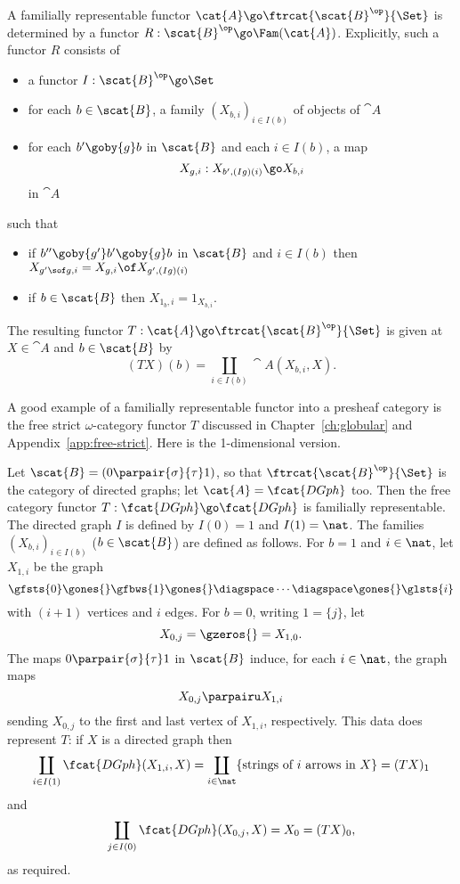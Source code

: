 A familially representable functor $\cat{A} \go
\ftrcat{\scat{B}^\op}{\Set}$ is determined by a functor $R: \scat{B}^\op
\go \Fam(\cat{A})$.  Explicitly, such a functor $R$ consists of
%
\begin{itemize}
\item a functor $I: \scat{B}^\op \go \Set$ 
\item for each $b \in \scat{B}$, a family $(X_{b,i})_{i\in I(b)}$ of objects
of $\cat{A}$
\item for each $b' \goby{g} b$ in $\scat{B}$ and each $i\in I(b)$, a map
\[
X_{g,i}: X_{b', (Ig)(i)} \go X_{b,i}
\]
in $\cat{A}$
\end{itemize}
%
such that
%
\begin{itemize}
\item if $b'' \goby{g'} b' \goby{g} b$ in $\scat{B}$ and $i\in I(b)$ then
$X_{g'\sof g, i} = X_{g, i} \of X_{g', (Ig)(i)}$
\item if $b\in \scat{B}$ then $X_{1_b,i} = 1_{X_{b,i}}$.
\end{itemize}
%
The resulting functor $T: \cat{A} \go \ftrcat{\scat{B}^\op}{\Set}$ is given
at $X \in \cat{A}$ and $b \in \scat{B}$ by
\[
(TX)(b) = \coprod_{i\in I(b)} \cat{A} (X_{b,i}, X).
\]

A good example of a familially representable functor into a presheaf
category is the free strict $\omega$-category%
%
%
functor $T$
discussed in Chapter~\ref{ch:globular} and Appendix~\ref{app:free-strict}.
Here is the 1-dimensional version.

\begin{example}
Let $\scat{B} = (0 \parpair{\sigma}{\tau} 1)$, so that
$\ftrcat{\scat{B}^\op}{\Set}$ is the category  of directed
graphs; let $\cat{A} = \fcat{DGph}$ too.  Then the free%
%
%
category functor
$T: \fcat{DGph} \go \fcat{DGph}$ is familially representable.  The directed
graph $I$ is defined by $I(0)=1$ and $I(1)=\nat$.  The families
$(X_{b,i})_{i\in I(b)}$ ($b\in \scat{B}$) are defined as follows.  For
$b=1$ and $i\in\nat$, let $X_{1,i}$ be the graph
\[
\gfsts{0} \gones{} \gfbws{1} \gones{} 
\diagspace \cdots \diagspace 
\gones{} \glsts{i}
\]
with $(i+1)$ vertices and $i$ edges.  For $b=0$, writing $1=\{j\}$, let
\[
X_{0,j} = \gzeros{} = X_{1,0}.
\]
The maps $0 \parpair{\sigma}{\tau} 1$ in $\scat{B}$ induce, for each
$i\in\nat$, the graph maps
\[
X_{0,j} \parpairu X_{1,i}
\]
sending $X_{0,j}$ to the first and last vertex of $X_{1,i}$, respectively.
This data does represent $T$: if $X$ is a directed graph then
\[
\coprod_{i\in I(1)} \fcat{DGph}(X_{1,i}, X)	
=
\coprod_{i\in \nat} 
\{ \textrm{strings of } i \textrm{ arrows in } X \}
= 
(TX)_1
\]
and
\[
\coprod_{j\in I(0)} \fcat{DGph}(X_{0,j}, X)	
=
X_0 
=
(TX)_0,
\]
as required.
\end{example}


